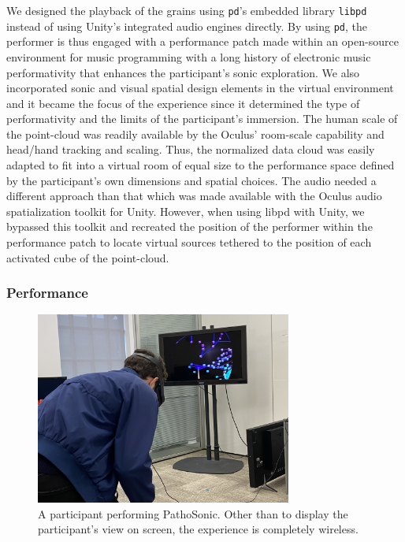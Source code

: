 \documentclass{nime-alternate}
\begin{document}
We designed the playback of the grains using \texttt{pd}’s embedded library \texttt{libpd} instead of using Unity’s integrated audio engines directly. By using \texttt{pd}, the performer is thus engaged with a performance patch made within an open-source environment for music programming with a long history of electronic music performativity that enhances the participant’s sonic exploration. We also incorporated sonic and visual spatial design elements in the virtual environment and it became the focus of the experience since it determined the type of performativity and the limits of the participant’s immersion. The human scale of the point-cloud was readily available by the Oculus’ room-scale capability and head/hand tracking and scaling. Thus, the normalized data cloud was easily adapted to fit into a virtual room of equal size to the performance space defined by the participant's own dimensions and spatial choices. The audio needed a different approach than that which was made available with the Oculus audio spatialization toolkit for Unity. However, when using libpd with Unity, we bypassed this toolkit and recreated the position of the performer within the performance patch to locate virtual sources tethered to the position of each activated cube of the point-cloud. 


\subsubsection{Performance}

\begin{figure}[htbp]
       \centering
              \includegraphics[width=0.75\textwidth]{IMG_4563.jpg}
       \caption{A participant performing PathoSonic. Other than to display the participant's view on screen, the experience is completely wireless.}
       \label{fig:IMG_4563}
\end{figure}
\end{document}
